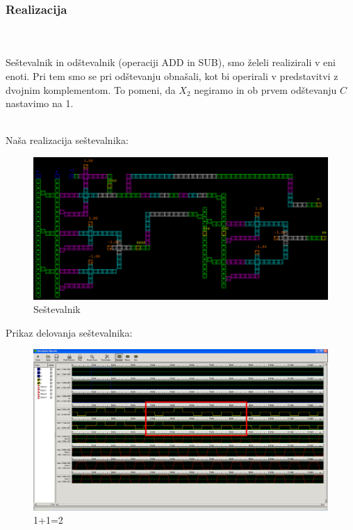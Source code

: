 \documentclass[seminar, slovene]{FRIreport}
\begin{document}
\subsubsection{Realizacija}\ \\ \ \\
Seštevalnik in odštevalnik (operaciji ADD in SUB), smo želeli realizirali v eni enoti. Pri tem smo se pri odštevanju obnašali, kot bi operirali v predstavitvi z dvojnim komplementom. To pomeni, da $X_2$ negiramo in ob prvem odštevanju $C$ nastavimo na 1.\\
\ \\
\begin{minipage}[H]{16cm}
Naša realizacija seštevalnika:
\begin{figure}[H]
\begin{center}
\includegraphics[width=16cm]{qca/img/sum}
\caption{Seštevalnik}
\label{sestevalnikqca}
\end{center}
\end{figure}
Prikaz delovanja seštevalnika:
\begin{figure}[H]
\includegraphics[width=14cm]{simulacije/1+1}
\caption{1+1=2}
\label{1+1}
\end{figure}
\end{minipage}
\end{document}
